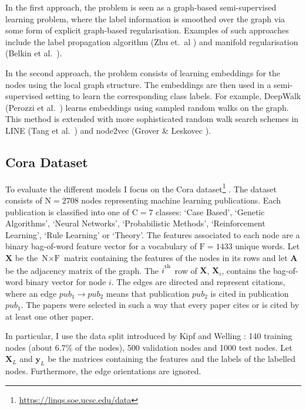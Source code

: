 \documentclass[12pt]{article}
\theoremstyle{definition}
\begin{document}
\bigskip

In the first approach, the problem is seen as a graph-based semi-supervised learning problem, where the label information is smoothed over the graph via some form of explicit graph-based regularisation. Examples of such approaches include the label propagation algorithm (Zhu et.\ al \cite{zhu2002learning}) and manifold regularisation (Belkin et al.\ \cite{belkin2006manifold}).

\bigskip

In the second approach, the problem consists of learning embeddings for the nodes using the local graph structure. The embeddings are then used in a semi-supervised setting to learn the corresponding class labels. For example, DeepWalk (Perozzi et al.\ \cite{perozzi2014deepwalk}) learns embeddings using sampled random walks on the graph. This method is extended with more sophisticated random walk search schemes in LINE (Tang et al.\ \cite{tang2015line}) and node2vec (Grover \& Leskovec \cite{grover2016node2vec}).


\subsection{Cora Dataset}
To evaluate the different models I focus on the Cora dataset\footnote{\url{https://linqs.soe.ucsc.edu/data}} \cite{cora}. The dataset consists of $\textrm{N} = 2708$ nodes representing machine learning publications. Each publication is classified into one of $\textrm{C} = 7$ classes: `Case Based', `Genetic Algorithms', `Neural Networks', `Probabilistic Methods', `Reinforcement Learning', `Rule Learning' or `Theory'. The features associated to each node are a binary bag-of-word feature vector for a vocabulary of $\textrm{F} = 1433$ unique words. Let $\mathbf{X}$ be the $\textrm{N} \times \textrm{F}$ matrix containing the features of the nodes in its rows and let $\mathbf{A}$ be the adjacency matrix of the graph. The $i^\textsuperscript{th}$ row of $\mathbf{X}$,  $\mathbf{X}_i$, contains the bag-of-word binary vector for node $i$. The edges are directed and represent citations, where an edge $\mathit{pub_1} \to \mathit{pub_2}$ means that publication $\mathit{pub_2}$ is cited in publication $\mathit{pub_1}$. The papers were selected in such a way that every paper cites or is cited by at least one other paper. 

\bigskip

In particular, I use the data split introduced by Kipf and Welling \cite{kipf2017semi}: 140 training nodes (about 6.7\% of the nodes), 500 validation nodes and 1000 test nodes. Let $\mathbf{X}_{L}$ and $\textbf{y}_L$ be the matrices containing the features and the labels of the labelled nodes. Furthermore, the edge orientations are ignored.
\end{document}
